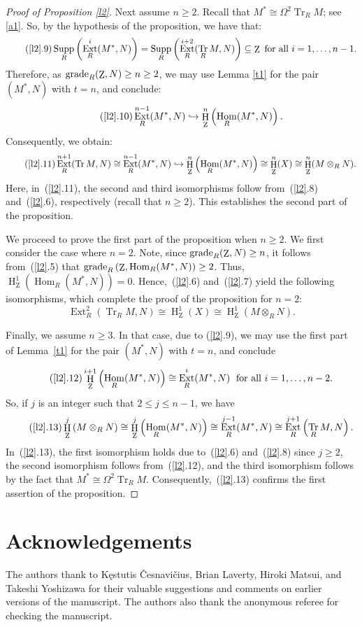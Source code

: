 \documentclass[11pt]{amsart}
\theoremstyle{definition}
\theoremstyle{definition}
\numberwithin{equation}{section}
\DeclareMathOperator{\gr}{\textnormal{grade}}
\DeclareMathOperator{\Tr}{Tr}
\DeclareMathOperator{\mz}{Z}
\DeclareMathOperator{\Ext}{Ext}
\DeclareMathOperator{\hh}{H}
\DeclareMathOperator{\Hom}{Hom}
\DeclareMathOperator{\Supp}{Supp}
\begin{document}
\begin{proof}[Proof of Proposition \ref{l2}]
Next assume $n\geq 2$. Recall that $M^{\ast} \cong \Omega^2\Tr_RM$; see \ref{a1}. So, by the hypothesis of the proposition, we have that:
\[
\tag{\ref{l2}.9} \Supp_R\left(\Ext^i_R(M^{\ast},N)\right)=\Supp_R\left(\Ext^{i+2}_R(\Tr_R M,N)\right)\subseteq\mz \text{ for all } i=1, \ldots, n-1. 
\]
Therefore, as $\gr_R(\mz,N)\geq n\geq 2$, we may use Lemma \ref{t1} for the pair $(M^{\ast}, N)$ with $t=n$, and conclude:
\[
\tag{\ref{l2}.10} \Ext^{n-1}_R(M^{\ast},N)\hookrightarrow\hh^n_{\mz}\left(\Hom_R(M^{\ast},N)\right).
\]
Consequently, we obtain:
\[
\tag{\ref{l2}.11} \Ext^{n+1}_R(\Tr M,N)\cong \Ext^{n-1}_R(M^{\ast},N)\hookrightarrow\hh^n_{\mz}\left(\Hom_R(M^{\ast},N)\right) \cong \hh^{n}_{\mz}(X) \cong \hh^n_{\mz}(M\otimes_RN). 
\]
Here, in~(\ref{l2}.11), the second and third isomorphisms follow from~(\ref{l2}.8) and~(\ref{l2}.6), respectively (recall that $n\geq 2$). This establishes the second part of the proposition.

We proceed to prove the first part of the proposition when $n\geq 2$. We first consider the case where $n=2$. Note, since $\gr_R(\mz,N)\geq n$, it follows from~(\ref{l2}.5) that $\gr_R\left(\mz,\Hom_R(M^{\ast},N)\right)\geq2$. Thus, $\hh^1_{\mz}\left(\Hom_R(M^{\ast},N)\right)=0$. Hence,~(\ref{l2}.6) and~(\ref{l2}.7) yield the following isomorphisms, which complete the proof of the proposition for $n=2$:
\[
\Ext^2_R(\Tr_R M,N) \cong \hh^1_{\mz}(X) \cong \hh^1_{\mz}(M\otimes_RN).
\]

Finally, we assume $n\geq 3$. In that case, due to (\ref{l2}.9), we may use the first part of Lemma~\ref{t1} for the pair $(M^{\ast}, N)$ with $t=n$, and conclude
\[
\tag{\ref{l2}.12} \hh_{\mz}^{i+1}\left(\Hom_R(M^{\ast},N)\right) \cong \Ext^i_R(M^{\ast},N)  \; \text{ for all } i=1, \ldots, n-2.
\]
So, if $j$ is an integer such that $2\leq j \leq n-1$, we have
\[
\tag{\ref{l2}.13}  \hh_{\mz}^{j}\left(M\otimes_RN\right) \cong \hh_{\mz}^{j}\left(\Hom_R(M^{\ast},N)\right) \cong \Ext^{j-1}_R(M^{\ast},N) \cong \Ext^{j+1}_R\left(\Tr_R M,N\right).
\]
In~(\ref{l2}.13), the first isomorphism holds due to~(\ref{l2}.6) and~(\ref{l2}.8) since $j\geq 2$, the second isomorphism follows from~(\ref{l2}.12), and the third isomorphism follows by the fact that $M^{\ast} \cong \Omega^2\Tr_RM$. Consequently,~(\ref{l2}.13) confirms the first assertion of the proposition.
\end{proof}


\section*{Acknowledgements}
The authors thank to K\k {e}stutis \v{C}esnavi\v{c}ius, Brian Laverty, Hiroki Matsui, and Takeshi Yoshizawa for their valuable suggestions and comments on earlier versions of the manuscript. The authors also thank the anonymous referee for checking the manuscript.
\end{document}
